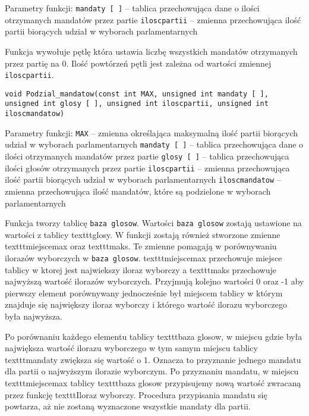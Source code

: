 \documentclass[12pt,a4paper]{article}
\begin{document}
Parametry funkcji:
\newline \texttt{mandaty [ ]} -- tablica przechowująca dane o ilości otrzymanych mandatów przez partie
\newline \texttt{iloscpartii} -- zmienna przechowująca ilość partii biorących udział w wyborach parlamentarnych 

Funkcja wywołuje pętlę która ustawia liczbę wszystkich mandatów otrzymanych przez partię na 0. Ilość powtórzeń pętli jest zależna od wartości zmiennej \texttt{iloscpartii}.

\begin{lstlisting}
void Podzial_mandatow(const int MAX, unsigned int mandaty [ ], unsigned int glosy [ ], unsigned int iloscpartii, unsigned int iloscmandatow)
\end{lstlisting}
Parametry funkcji: \newline
\texttt{MAX} -- zmienna określająca maksymalną ilość partii biorących udział w wyborach parlamentarnych
\newline \texttt{mandaty [ ]} -- tablica przechowująca dane o ilości otrzymanych mandatów przez partie
\newline \texttt{glosy [ ]} -- tablica przechowująca ilości głosów otrzymanych przez partie
\newline \texttt{iloscpartii} -- zmienna przechowująca ilość partii biorących udział w wyborach parlamentarnych 
\texttt{iloscmandatow} -- zmienna przechowująca ilość mandatów, które są podzielone w wyborach parlamentarnych \newline

Funkcja tworzy tablicę \texttt{baza glosow}. Wartości \texttt{baza glosow} zostają ustawione na wartości z tablicy texttt{glosy}. W funkcji zostają również stworzone zmienne texttt{miejscemax} oraz texttt{maks}. Te zmienne pomagają w porównywaniu ilorazów wyborczych w \texttt{baza glosow}. texttt{miejscemax} przechowuje miejsce tablicy w ktorej jest najwiekszy iloraz wyborczy a texttt{maks} przechowuje najwyższą wartość ilorazów wyborczych. Przyjmują kolejno wartości 0 oraz -1 aby pierwszy element porównywany jednocześnie był miejscem tablicy w którym znajduje się największy iloraz wyborczy i którego wartość ilorazu wyborczego była najwyższa.

Po porównaniu każdego elementu tablicy texttt{baza glosow}, w miejscu gdzie była największa wartość ilorazu wyborczego w tym samym miejscu tablicy texttt{mandaty} zwiększa się wartość o 1. Oznacza to przyznanie jednego mandatu dla partii o najwyższym ilorazie wyborczym. Po przyznaniu mandatu, w miejscu texttt{miejscemax} tablicy texttt{baza glosow} przypisujemy nową wartość zwracaną przez funkcję texttt{Iloraz wyborczy}. Procedura przypisania mandatu się powtarza, aż nie zostaną wyznaczone wszystkie mandaty dla partii.    
\end{document}
